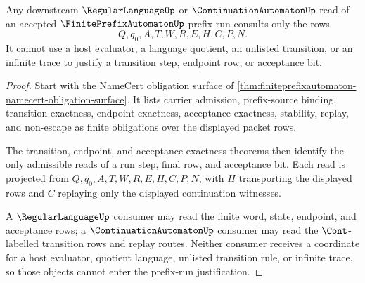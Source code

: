 \begin{theorem}
\label{thm:finiteprefixautomaton-prefix-run-nonescape}
Any downstream $\RegularLanguageUp$ or $\ContinuationAutomatonUp$ read of an accepted $\FinitePrefixAutomatonUp$ prefix run consults only the rows
$$
Q,q_0,A,T,W,R,E,H,C,P,N .
$$
It cannot use a host evaluator, a language quotient, an unlisted transition, or an infinite trace to justify a transition step, endpoint row, or acceptance bit.
\end{theorem}
\begin{proof}
Start with the NameCert obligation surface of \autoref{thm:finiteprefixautomaton-namecert-obligation-surface}. It lists carrier admission, prefix-source binding, transition exactness, endpoint exactness, acceptance exactness, stability, replay, and non-escape as finite obligations over the displayed packet rows.

The transition, endpoint, and acceptance exactness theorems then identify the only admissible reads of a run step, final row, and acceptance bit. Each read is projected from $Q,q_0,A,T,W,R,E,H,C,P,N$, with $H$ transporting the displayed rows and $C$ replaying only the displayed continuation witnesses.

A $\RegularLanguageUp$ consumer may read the finite word, state, endpoint, and acceptance rows; a $\ContinuationAutomatonUp$ consumer may read the $\Cont$-labelled transition rows and replay routes. Neither consumer receives a coordinate for a host evaluator, quotient language, unlisted transition rule, or infinite trace, so those objects cannot enter the prefix-run justification.
\end{proof}

